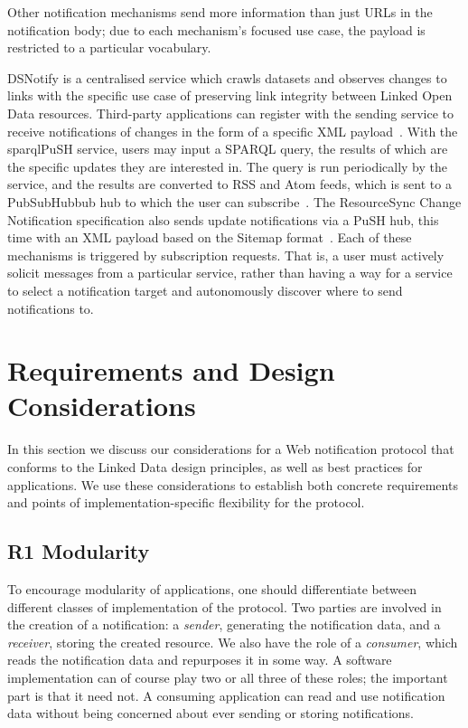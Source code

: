 \documentclass[a4paper]{llncs}
\begin{document}
\par Other notification mechanisms send more information than just URLs in the notification body; due to each mechanism’s focused use case, the payload is restricted to a particular vocabulary.


\par \empty DSNotify is a centralised service which crawls datasets and observes changes to links with the specific use case of preserving link integrity between Linked Open Data resources. Third-party applications can register with the sending service to receive notifications of changes in the form of a specific XML payload~\cite{ref-8}. With the \empty sparqlPuSH service, users may input a SPARQL query, the results of which are the specific updates they are interested in. The query is run periodically by the service, and the results are converted to RSS and Atom feeds, which is sent to a \empty PubSubHubbub hub to which the user can subscribe~\cite{ref-9}. The \empty ResourceSync Change Notification specification also sends update notifications via a PuSH hub, this time with an XML payload based on the Sitemap format~\cite{ref-10}. Each of these mechanisms is triggered by subscription requests. That is, a user must actively solicit messages from a particular service, rather than having a way for a service to select a notification target and autonomously discover where to send notifications to.




                        \section{Requirements and Design Considerations}
  \label{requirements-and-design-considerations}



\par In this section we discuss our considerations for a Web notification protocol that conforms to the Linked Data design principles, as well as best practices for applications. We use these considerations to establish both concrete requirements and points of implementation-specific flexibility for the protocol.


                                \subsection{R1 Modularity}
  \label{modularity}



\par To encourage modularity of applications, one should differentiate between different classes of implementation of the protocol. Two parties are involved in the creation of a notification: a {\em sender}, generating the notification data, and a {\em receiver}, storing the created resource. We also have the role of a {\em consumer}, which reads the notification data and repurposes it in some way. A software implementation can of course play two or all three of these roles; the important part is that it need not. A consuming application can read and use notification data without being concerned about ever sending or storing notifications.
\end{document}
